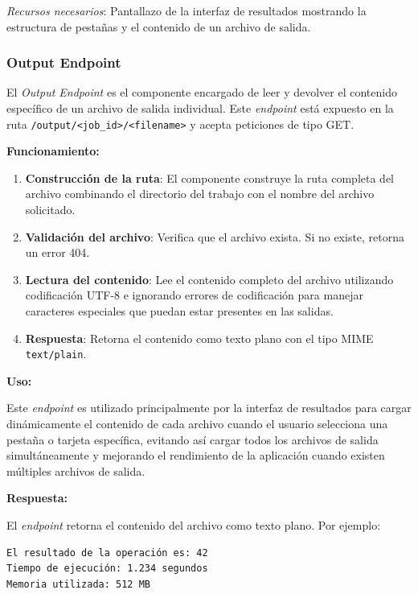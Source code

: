 \textit{Recursos necesarios}: Pantallazo de la interfaz de resultados mostrando la estructura de pestañas y el contenido de un archivo de salida.

\subsubsection{Output Endpoint}
\noindent

El \textit{Output Endpoint} es el componente encargado de leer y devolver el contenido específico de un archivo de salida individual. Este \textit{endpoint} está expuesto en la ruta \texttt{/output/<job\_id>/<filename>} y acepta peticiones de tipo GET.

\textbf{Funcionamiento:}

\begin{enumerate}
	\item \textbf{Construcción de la ruta}: El componente construye la ruta completa del archivo combinando el directorio del trabajo con el nombre del archivo solicitado.
	
	\item \textbf{Validación del archivo}: Verifica que el archivo exista. Si no existe, retorna un error 404.
	
	\item \textbf{Lectura del contenido}: Lee el contenido completo del archivo utilizando codificación UTF-8 e ignorando errores de codificación para manejar caracteres especiales que puedan estar presentes en las salidas.
	
	\item \textbf{Respuesta}: Retorna el contenido como texto plano con el tipo MIME \texttt{text/plain}.
\end{enumerate}

\textbf{Uso:}

Este \textit{endpoint} es utilizado principalmente por la interfaz de resultados para cargar dinámicamente el contenido de cada archivo cuando el usuario selecciona una pestaña o tarjeta específica, evitando así cargar todos los archivos de salida simultáneamente y mejorando el rendimiento de la aplicación cuando existen múltiples archivos de salida.

\textbf{Respuesta:}

El \textit{endpoint} retorna el contenido del archivo como texto plano. Por ejemplo:

\begin{verbatim}
El resultado de la operación es: 42
Tiempo de ejecución: 1.234 segundos
Memoria utilizada: 512 MB
\end{verbatim}

